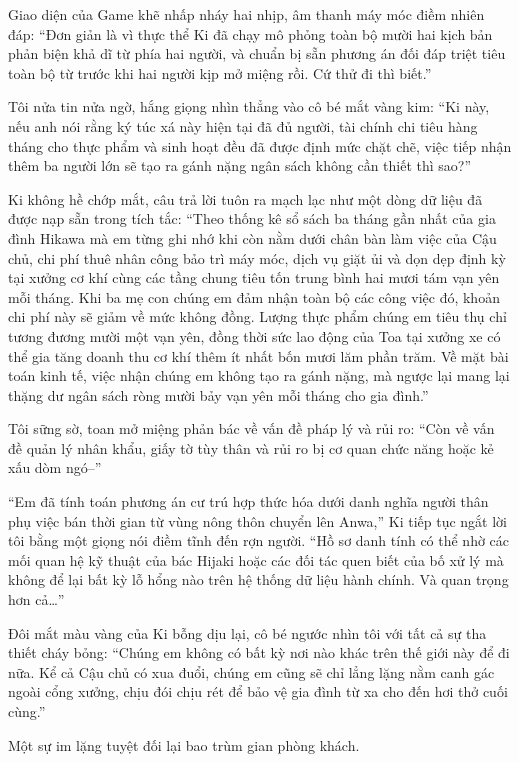 \documentclass[../main.tex]{subfiles}
\begin{document}
Giao diện của Game khẽ nhấp nháy hai nhịp, âm thanh máy móc điềm nhiên đáp: ``Đơn giản là vì thực thể Ki đã chạy mô phỏng toàn bộ mười hai kịch bản phản biện khả dĩ từ phía hai người, và chuẩn bị sẵn phương án đối đáp triệt tiêu toàn bộ từ trước khi hai người kịp mở miệng rồi. Cứ thử đi thì biết.''

Tôi nửa tin nửa ngờ, hắng giọng nhìn thẳng vào cô bé mắt vàng kim: ``Ki này, nếu anh nói rằng ký túc xá này hiện tại đã đủ người, tài chính chi tiêu hàng tháng cho thực phẩm và sinh hoạt đều đã được định mức chặt chẽ, việc tiếp nhận thêm ba người lớn sẽ tạo ra gánh nặng ngân sách không cần thiết thì sao?''

Ki không hề chớp mắt, câu trả lời tuôn ra mạch lạc như một dòng dữ liệu đã được nạp sẵn trong tích tắc: ``Theo thống kê sổ sách ba tháng gần nhất của gia đình Hikawa mà em từng ghi nhớ khi còn nằm dưới chân bàn làm việc của Cậu chủ, chi phí thuê nhân công bảo trì máy móc, dịch vụ giặt ủi và dọn dẹp định kỳ tại xưởng cơ khí cùng các tầng chung tiêu tốn trung bình hai mươi tám vạn yên mỗi tháng. Khi ba mẹ con chúng em đảm nhận toàn bộ các công việc đó, khoản chi phí này sẽ giảm về mức không đồng. Lượng thực phẩm chúng em tiêu thụ chỉ tương đương mười một vạn yên, đồng thời sức lao động của Toa tại xưởng xe có thể gia tăng doanh thu cơ khí thêm ít nhất bốn mươi lăm phần trăm. Về mặt bài toán kinh tế, việc nhận chúng em không tạo ra gánh nặng, mà ngược lại mang lại thặng dư ngân sách ròng mười bảy vạn yên mỗi tháng cho gia đình.''

Tôi sững sờ, toan mở miệng phản bác về vấn đề pháp lý và rủi ro: ``Còn về vấn đề quản lý nhân khẩu, giấy tờ tùy thân và rủi ro bị cơ quan chức năng hoặc kẻ xấu dòm ngó--''

``Em đã tính toán phương án cư trú hợp thức hóa dưới danh nghĩa người thân phụ việc bán thời gian từ vùng nông thôn chuyển lên Anwa,'' Ki tiếp tục ngắt lời tôi bằng một giọng nói điềm tĩnh đến rợn người. ``Hồ sơ danh tính có thể nhờ các mối quan hệ kỹ thuật của bác Hijaki hoặc các đối tác quen biết của bố xử lý mà không để lại bất kỳ lỗ hổng nào trên hệ thống dữ liệu hành chính. Và quan trọng hơn cả\dots''

Đôi mắt màu vàng của Ki bỗng dịu lại, cô bé ngước nhìn tôi với tất cả sự tha thiết cháy bỏng: ``Chúng em không có bất kỳ nơi nào khác trên thế giới này để đi nữa. Kể cả Cậu chủ có xua đuổi, chúng em cũng sẽ chỉ lẳng lặng nằm canh gác ngoài cổng xưởng, chịu đói chịu rét để bảo vệ gia đình từ xa cho đến hơi thở cuối cùng.''

Một sự im lặng tuyệt đối lại bao trùm gian phòng khách.
\end{document}
